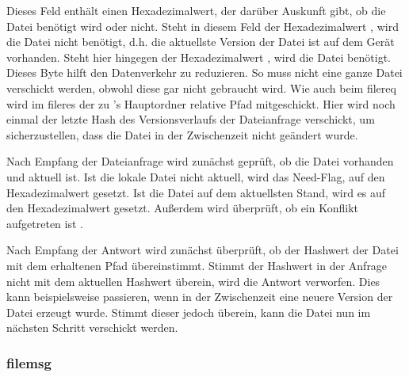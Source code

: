 \begin{description}
		Dieses Feld enthält einen Hexadezimalwert, der darüber Auskunft gibt, ob die Datei benötigt wird oder nicht. Steht in diesem Feld der Hexadezimalwert , wird die Datei nicht benötigt, d.h. die aktuellste Version der Datei ist auf dem Gerät vorhanden. Steht hier hingegen der Hexadezimalwert , wird die Datei benötigt. Dieses Byte hilft den Datenverkehr zu reduzieren. So muss nicht eine ganze Datei verschickt werden, obwohl diese gar nicht gebraucht wird.
		Wie auch beim \gls{filereq} wird im \gls{fileres} der zu \sblit's Hauptordner relative Pfad mitgeschickt.
		Hier wird noch einmal der letzte Hash des Versionsverlaufs der Dateianfrage verschickt, um sicherzustellen, dass die Datei in der Zwischenzeit nicht geändert wurde. 
\end{description}
Nach Empfang der Dateianfrage wird zunächst geprüft, ob die Datei vorhanden und aktuell ist. Ist die lokale Datei nicht aktuell, wird das Need-Flag, auf den Hexadezimalwert  gesetzt. Ist die Datei auf dem aktuellsten Stand, wird es auf den Hexadezimalwert  gesetzt. Außerdem wird überprüft, ob ein Konflikt aufgetreten ist .

Nach Empfang der Antwort wird zunächst überprüft, ob der Hashwert der Datei mit dem erhaltenen Pfad übereinstimmt. Stimmt der Hashwert in der Anfrage nicht mit dem aktuellen Hashwert überein, wird die Antwort verworfen. Dies kann beispielsweise passieren, wenn in der Zwischenzeit eine neuere Version der Datei erzeugt wurde. Stimmt dieser jedoch überein, kann die Datei nun im nächsten Schritt verschickt werden.
		
\subsubsection{\gls{filemsg}}
\messagestart
	 \\
	
	\begin{rightwordgroup}{\isprotomsgtype}
	\end{rightwordgroup} \\
	
